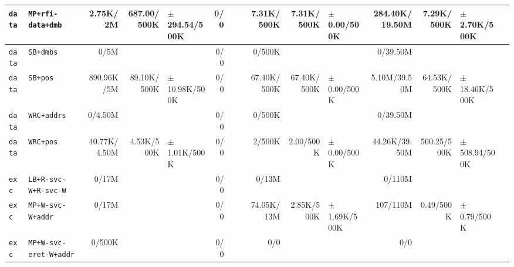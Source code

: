\begin{tabular}{l l  | r r l | r r l | r r l | r r l l}
           \verb|data| &                                     \verb|MP+rfi-data+dmb| &       2.75K/2M &           687.00/500K & $\pm$ 294.54/500K &            0/0 &                       &  &     7.31K/500K &            7.31K/500K &   $\pm$ 0.00/500K & 284.40K/19.50M &            7.29K/500K &  $\pm$ 2.70K/500K & \\ \hline 
           \verb|data| &                                             \verb|SB+dmbs| &           0/5M &                       &                   &            0/0 &                       &  &         0/500K &                       &                   &       0/39.50M &                       &                   & \\ \hline 
           \verb|data| &                                              \verb|SB+pos| &     890.96K/5M &           89.10K/500K & $\pm$ 10.98K/500K &            0/0 &                       &  &    67.40K/500K &           67.40K/500K &   $\pm$ 0.00/500K &   5.10M/39.50M &           64.53K/500K & $\pm$ 18.46K/500K & \\ \hline 
           \verb|data| &                                           \verb|WRC+addrs| &        0/4.50M &                       &                   &            0/0 &                       &  &         0/500K &                       &                   &       0/39.50M &                       &                   & \\ \hline 
           \verb|data| &                                             \verb|WRC+pos| &   40.77K/4.50M &            4.53K/500K &  $\pm$ 1.01K/500K &            0/0 &                       &  &         2/500K &             2.00/500K &   $\pm$ 0.00/500K &  44.26K/39.50M &           560.25/500K & $\pm$ 508.94/500K & \\ \hline 
            \verb|exc| &                                  \verb|LB+R-svc-W+R-svc-W| &          0/17M &                       &                   &            0/0 &                       &  &          0/13M &                       &                   &         0/110M &                       &                   & \\ \hline 
            \verb|exc| &                                     \verb|MP+W-svc-W+addr| &          0/17M &                       &                   &            0/0 &                       &  &     74.05K/13M &            2.85K/500K &  $\pm$ 1.69K/500K &       107/110M &             0.49/500K &   $\pm$ 0.79/500K & \\ \hline 
            \verb|exc| &                                \verb|MP+W-svc-eret-W+addr| &         0/500K &                       &                   &            0/0 &                       &  &            0/0 &                       &                   &            0/0 &                       &                   & \\ \hline 

\end{tabular}
